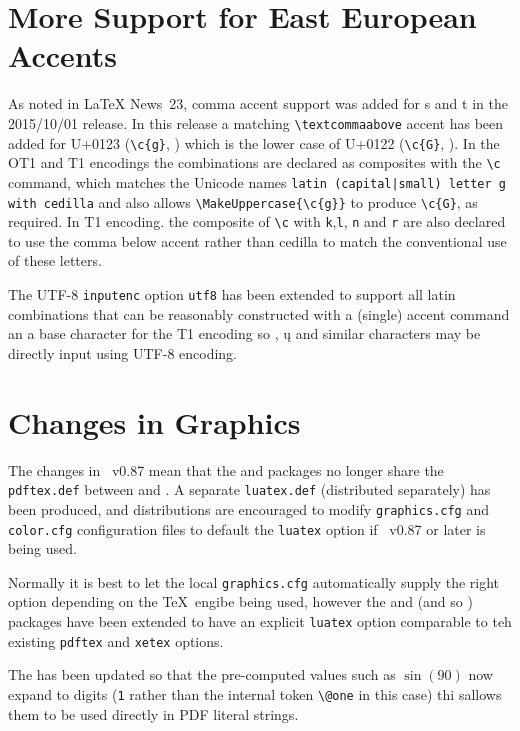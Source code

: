\documentclass{ltnews}
\begin{document}
\section{More Support for East European Accents}

As noted in \LaTeX{} News~23, comma accent support was added for s and
t in the 2015/10/01 release. In this release a matching
\verb|\textcommaabove| accent has been added for U+0123 (\verb|\c{g}|,
) which is the lower case of U+0122 (\verb|\c{G}|,
).  In the OT1 and T1 encodings the combinations are
declared as composites with the \verb|\c| command, which matches the
Unicode names \texttt{latin (capital|small) letter g with cedilla} and
also allows \verb|\MakeUppercase{\c{g}}| to produce \verb|\c{G}|, as
required.  In T1 encoding. the composite of \verb|\c| with \texttt{k},\texttt{l},
\texttt{n} and \texttt{r} are also
declared to use the comma below accent rather than cedilla to match the
conventional use of these letters.

The UTF-8 \texttt{inputenc} option \texttt{utf8} has been extended to
support all latin combinations that can be reasonably constructed with a
(single) accent command an a base character for the T1 encoding so
, \k{u} and similar characters may be directly input
using UTF-8 encoding.

\section{Changes in Graphics}
The changes in ~v0.87 mean that the  and
 packages no longer share the \texttt{pdftex.def}
between and . A separate
\texttt{luatex.def} (distributed separately) has been produced, and
distributions are encouraged to modify \texttt{graphics.cfg} and
\texttt{color.cfg} configuration files to default the \texttt{luatex}
option if ~v0.87 or later is being used.

Normally it is best to let the local  \texttt{graphics.cfg}
automatically supply the right option depending on the \TeX\ engibe
being used, however the  and  (and so
) packages have been extended to have an explicit
\texttt{luatex} option comparable to teh existing \texttt{pdftex} and
\texttt{xetex} options.

The  has been updated so that the pre-computed values
such as $\sin(90)$ now expand to digits (\texttt{1} rather than the
internal token \verb|\@one| in this case) thi sallows them to be used
directly in PDF literal strings. 
\end{document}
